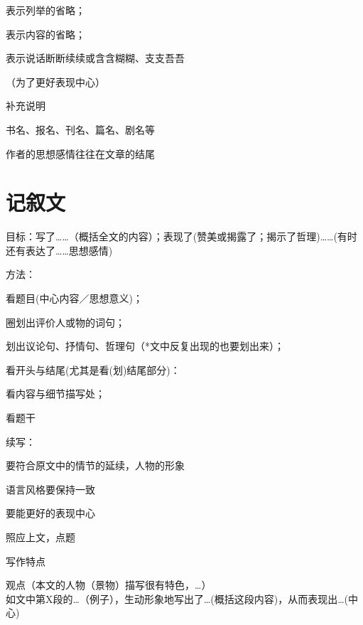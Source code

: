\begin{asparaenum}[(1)]
\item 表示列举的省略；
\item 表示内容的省略；
\item 表示说话断断续续或含含糊糊、支支吾吾
\item （为了更好表现中心）
\end{asparaenum}

补充说明

书名、报名、刊名、篇名、剧名等

作者的思想感情往往在文章的结尾

\section{记叙文}

目标：写了\ldots{}\ldots{}（概括全文的内容）；表现了(赞美或揭露了；揭示了哲理)\ldots{}\ldots{}(有时还有表达了\ldots{}\ldots{}思想感情)\par
方法：\begin{asparaenum}[(1)]\item 看题目(中心内容／思想意义)；
        \item 圈划出评价人或物的词句；
        \item 划出议论句、抒情句、哲理句（*文中反复出现的也要划出来）；
        \item 看开头与结尾(尤其是看(划)结尾部分)：
        \item 看内容与细节描写处；
        \item 看题干
\end{asparaenum}

续写：
\begin{asparaenum}[(1)]
\item 要符合原文中的情节的延续，人物的形象
\item 语言风格要保持一致
\item 要能更好的表现中心
\item 照应上文，点题
\end{asparaenum}
写作特点
\begin{asparaenum}
\item 观点（本文的人物（景物）描写很有特色，\ldots{}）\\如文中第X段的\ldots{}（例子），生动形象地写出了\ldots{}(概括这段内容)，从而表现出\ldots{}(中心)
\end{asparaenum}

